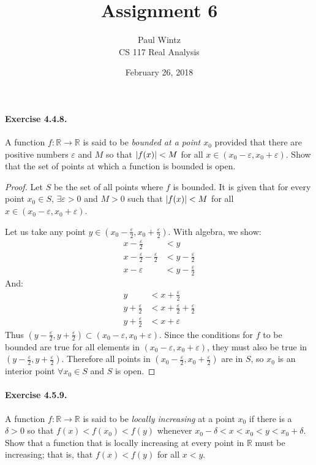 \documentclass[11pt]{article}
\title{Assignment 6}
\author{Paul Wintz\\CS 117 Real Analysis}
\date{February 26, 2018}
\DeclarePairedDelimiter{\abs}{\lvert}{\rvert}
\def \R {\mathbb{R}}
\def \epsilon {\varepsilon}
\def \halfepsilon{\frac{\epsilon}{2}}
\begin{document}
\maketitle


\paragraph{Exercise 4.4.8.} A function $f: \R \rightarrow \R$ is said to be \textit{bounded at a point $x_0$} provided that there are positive numbers $\epsilon$ and $M$ so that $\abs{f(x)} < M$ for all $x \in (x_0 - \epsilon, x_0 + \epsilon)$. 
Show that the set of points at which a function is bounded is open.

\begin{proof}
	Let $S$ be the set of all points where $f$ is bounded. It is given that for every point $x_0 \in S$, $\exists \epsilon >0$ and $M > 0$ such that $\abs{f(x)} < M$ for all $x \in (x_0 - \epsilon, x_0 + \epsilon)$. 
	
	Let us take any point $y \in (x_0 - \halfepsilon, x_0 + \halfepsilon)$. With algebra, we show:
	\begin{align*}
		x - \halfepsilon &< y \\
		x - \halfepsilon - \halfepsilon &< y - \halfepsilon \\
		x - \epsilon &< y - \halfepsilon
	\end{align*}	
	And: 
	\begin{align*}
	y &< x + \halfepsilon\\
	y + \halfepsilon &< x + \halfepsilon + \halfepsilon\\
	y + \halfepsilon &< x + \epsilon
	\end{align*}
	 Thus $(y - \halfepsilon, y + \halfepsilon) \subset (x_0 - \epsilon, x_0 + \epsilon)$. Since the conditions for $f$ to be bounded are true for all elements in $(x_0 - \epsilon, x_0 + \epsilon)$, they must also be true in $(y - \halfepsilon, y + \halfepsilon)$. Therefore all points in $(x_0 - \halfepsilon, x_0 + \halfepsilon)$ are in $S$, so $x_0$ is an interior point $\forall x_0 \in S$ and $S$ is open.
\end{proof}

\paragraph{Exercise 4.5.9.} A function $f: \R \rightarrow \R$ is said to be \textit{locally increasing} at a point $x_0$ if there is a $\delta > 0$ so that $f(x) < f(x_0) < f(y)$ whenever $x_0-\delta < x < x_0 < y < x_0+\delta.$ Show that a function that is locally increasing at every point in $\R$ must be increasing; that is, that $f(x) < f(y)$ for all $x < y$.
\end{document}
